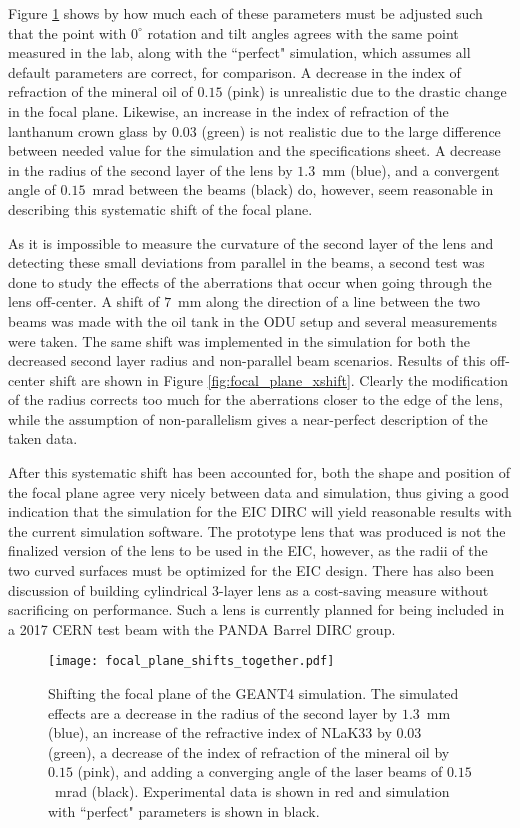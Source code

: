 Figure \ref{fig:focal_plane_shifts} shows by how much each of these parameters must be adjusted such that the point with $0^\circ$ rotation and tilt angles agrees with the same point measured in the lab, along with the ``perfect" simulation, which assumes all default parameters are correct, for comparison. A decrease in the index of refraction of the mineral oil of $0.15$ (pink) is unrealistic due to the drastic change in the focal plane. Likewise, an increase in the index of refraction of the lanthanum crown glass by $0.03$ (green) is not realistic due to the large difference between needed value for the simulation and the specifications sheet. A decrease in the radius of the second layer of the lens by $1.3$~mm (blue), and a convergent angle of $0.15$~mrad between the beams (black) do, however, seem reasonable in describing this systematic shift of the focal plane. 

As it is impossible to measure the curvature of the second layer of the lens and detecting these small deviations from parallel in the beams, a second test was done to study the effects of the aberrations that occur when going through the lens off-center. A shift of $7$~mm along the direction of a line between the two beams was made with the oil tank in the ODU setup and several measurements were taken. The same shift was implemented in the simulation for both the decreased second layer radius and non-parallel beam scenarios. Results of this off-center shift are shown in Figure \ref{fig:focal_plane_xshift}. Clearly the modification of the radius corrects too much for the aberrations closer to the edge of the lens, while the assumption of non-parallelism gives a near-perfect description of the taken data.

After this systematic shift has been accounted for, both the shape and position of the focal plane agree very nicely between data and simulation, thus giving a good indication that the simulation for the EIC DIRC will yield reasonable results with the current simulation software. The prototype lens that was produced is not the finalized version of the lens to be used in the EIC, however, as the radii of the two curved surfaces must be optimized for the EIC design. There has also been discussion of building cylindrical 3-layer lens as a cost-saving measure without sacrificing on performance. Such a lens is currently planned for being included in a 2017 CERN test beam with the PANDA Barrel DIRC group.

\begin{figure}[!htb]
	\centering
	\texttt{[image: focal\_plane\_shifts\_together.pdf]}
	\caption[Shifting the focal plane of the GEANT4 simulation.]{Shifting the focal plane of the GEANT4 simulation. The simulated effects are a decrease in the radius of the second layer by $1.3$~mm (blue), an increase of the refractive index of NLaK33 by $0.03$ (green), a decrease of the index of refraction of the mineral oil by $0.15$ (pink), and adding a converging angle of the laser beams of $0.15$~mrad (black). Experimental data is shown in red and simulation with ``perfect" parameters is shown in black.}
	\label{fig:focal_plane_shifts}
\end{figure}

